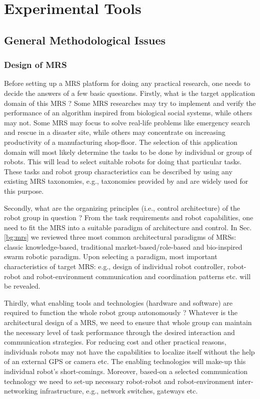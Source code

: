 \chapter{Experimental Tools}
\section{General Methodological Issues}
\subsection{Design of MRS}
Before setting up a MRS platform for doing any practical research, one needs to decide the answers of  a few basic questions. 
Firstly, what  is the target application domain of this MRS ? Some MRS researches may try to implement and verify the performance of an algorithm inspired from biological social systems, while others may not. Some MRS may focus to solve real-life problems like emergency search and rescue in a disaster site, while others may concentrate on increasing productivity of a manufacturing shop-floor.  The selection of this application domain will most likely determine the tasks to be done by individual or group of robots. This will lead to select suitable robots for doing that particular tasks. These tasks and robot group characteristics can be described by using any existing MRS taxonomies, e.g.,  taxonomies provided by   \cite{Gerkey+2004} and \cite{Dudek+1996} are widely used for this purpose. 

Secondly,  what are the organizing principles (i.e., control architecture) of  the robot group in question ? From the task requirements and robot capabilities,  one need to fit the MRS into a suitable paradigm of architecture and control. In Sec. \ref{bg:mrs} we reviewed three most common architectural paradigms of MRSs: classic knowledge-based, traditional market-based/role-based and bio-inspired swarm robotic paradigm. Upon selecting a paradigm, most important characteristics of target MRS: e.g., design of individual robot controller, robot-robot and robot-environment communication and coordination patterns etc. will be revealed.

Thirdly, what enabling tools and technologies (hardware and software) are required to function the whole robot group autonomously ? Whatever is the architectural design of a MRS, we need to ensure that whole group can maintain the necessary level of task performance through the desired interaction and communication strategies. For reducing cost and other practical reasons, individuals robots may not have the capabilities to localize itself without the help of an external GPS or camera etc. The enabling technologies will make-up this individual robot's short-comings. Moreover, based-on a selected communication technology we need to set-up necessary robot-robot and robot-environment inter-networking infrastructure, e.g., network switches, gateways etc.

